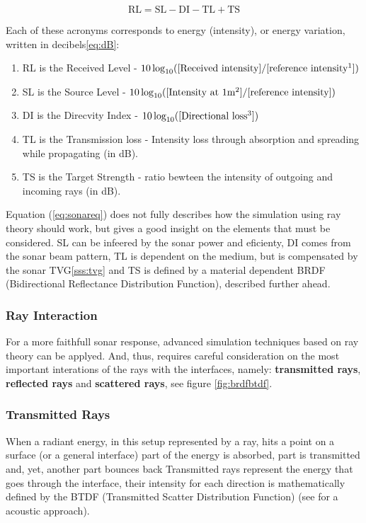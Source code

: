 \begin{equation}
\label{eq:sonareq}
\text{RL} = \text{SL} - \text{DI} - \text{TL} + \text{TS}
\end{equation}

Each of these acronyms corresponds to energy (intensity), or energy variation,
written in decibels\ref{eq:dB}:
\begin{enumerate}
  \item RL is the Received Level - $10\log_{10}([\text{Received
  intensity}]/[\text{reference intensity\footnotemark}])$
  \item SL is the Source Level - $10\log_{10}([\text{Intensity at
  1m\footnotemark}]/[\text{reference
  intensity}])$
  \item DI is the Direcvity Index - $10\log_{10}([\text{Directional
  loss\footnotemark}])$
  \item TL is the Transmission loss - Intensity loss through absorption and
  spreading while propagating (in dB).
  \item TS is the Target Strength - ratio bewteen the intensity of outgoing
  and incoming rays (in dB).
\end{enumerate}



Equation (\ref{eq:sonareq}) does not fully describes how the simulation
using ray theory should work, but gives a good insight on the elements that must
be considered. SL can be infeered by the sonar power and eficienty, DI comes
from the sonar beam pattern, TL is dependent on the medium, but is compensated
by the sonar TVG\ref{sss:tvg} and TS is defined by a material dependent BRDF
(Bidirectional Reflectance Distribution Function), described further ahead.

\subsubsection{Ray Interaction}

For a more faithfull sonar response, advanced simulation techniques based on ray
theory can be applyed. And, thus, requires careful consideration on the most
important interations of the rays with the interfaces, namely:
\textbf{transmitted rays}, \textbf{reflected rays}  and \textbf{scattered rays},
see figure \ref{fig:brdfbtdf}.

\subsubsection{Transmitted Rays}
When a radiant energy, in this setup represented by a ray, hits a point on a
surface (or a general interface) part of the energy is absorbed, part is
transmitted and, yet, another part bounces back Transmitted rays represent the
energy that goes through the interface, their intensity for each direction is
mathematically defined by the BTDF (Transmitted Scatter Distribution
Function)\cite{bartell1981theory} (see \citet{rober2007ray} for a acoustic
approach).


